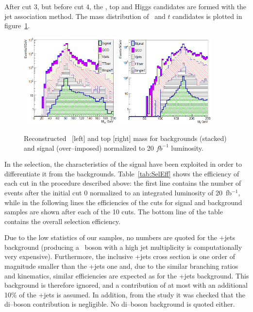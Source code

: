 After cut 3, but before cut 4, the \W, top and Higgs candidates are formed with the jet association method. The mass distribution of \W~and $t$ candidates is plotted in figure~\ref{fig:MWMTop}.

\begin{figure}[!Hhtbp]
  \begin{center}
    \includegraphics[width=0.45\textwidth]{figs/Pheno/MW.png}
    \includegraphics[width=0.45\textwidth]{figs/Pheno/Mtop.png}
    \caption{Reconstructed \W~[left] and top [right] mass for backgrounds (stacked) and signal (over--imposed) normalized to 20 $fb^{-1}$ luminosity.}
    \label{fig:MWMTop}
  \end{center}
\end{figure}

In the selection, the characteristics of the signal have been exploited in order to differentiate it from the backgrounds. Table~\ref{tab:SelEff} shows the efficiency of each cut in the procedure described above: the first line contains the number of events after the initial cut 0 normalized to an integrated luminosity of 20~fb$^{-1}$, while in the following lines the efficiencies of the cuts for signal and background samples are shown after each of the 10 cuts. The bottom line of the table contains the overall selection efficiency. 

Due to the low statistics of our samples, no numbers are quoted for the \Z+jets background (producing a \Z~boson with a high jet multiplicity is computationally very expensive). Furthermore, the inclusive \Z+jets cross section is one order of magnitude smaller than the \W+jets one and, due to the similar branching ratios and kinematics, similar efficiencies are expected as for the \W+jets background. This background is therefore ignored, and a contribution of at most with an additional 10\% of the \W+jets is assumed. In addition, from the study it was checked that the di--boson contribution is negligible. No di--boson background is quoted either.

